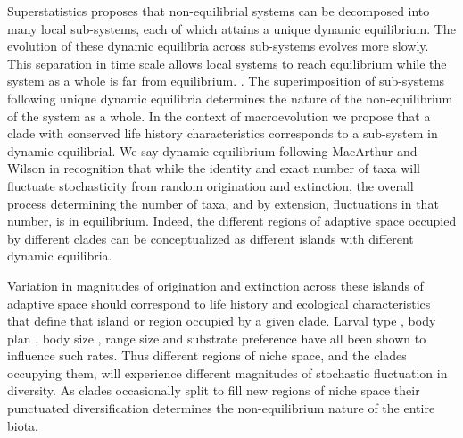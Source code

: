 \documentclass[12pt]{article}
\let\citep=\autocite
\begin{document}
Superstatistics \citep{beck2003} proposes that non-equilibrial systems
can be decomposed into many local sub-systems, each of which attains a
unique dynamic equilibrium. The evolution of these dynamic equilibria
across sub-systems evolves more slowly. This separation in time scale
allows local systems to reach equilibrium while the system as a whole
is far from equilibrium.  \citep{beck2003}. The superimposition of
sub-systems following unique dynamic equilibria determines the nature
of the non-equilibrium of the system as a whole. In the context of
macroevolution we propose that a clade with conserved life history
characteristics corresponds to a sub-system in dynamic equilibrial.
We say dynamic equilibrium following MacArthur and Wilson
\citep{macWilson} in recognition that while the identity and exact
number of taxa will fluctuate stochasticity from random origination
and extinction, the overall process determining the number of taxa,
and by extension, fluctuations in that number, is in
equilibrium. Indeed, the different regions of adaptive space occupied
by different clades can be conceptualized as different islands with
different dynamic equilibria.

Variation in magnitudes of origination and extinction across these
islands of adaptive space should correspond to life history and
ecological characteristics that define that island or region occupied
by a given clade. Larval type \citep{jablonski2008}, body plan
\citep{erwin2012}, body size \citep{harnik2011}, range size
\citep{harnik2011, foote2008paleobiol} and substrate preference
\citep{hopkins2014} have all been shown to influence such rates. Thus
different regions of niche space, and the clades occupying them, will
experience different magnitudes of stochastic fluctuation in
diversity. As clades occasionally split to fill new regions of niche
space their punctuated diversification determines the non-equilibrium
nature of the entire biota.
\end{document}
